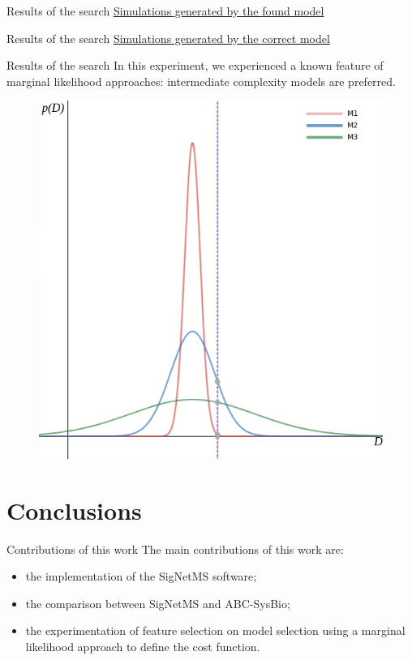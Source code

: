 \documentclass{beamer}
\begin{document}
\begin{frame}{Results of the search}
\href{https://linux.ime.usp.br/~gustavoem/defesa/ras_solution_simulations.gif}
{Simulations generated by the found model}
\end{frame}

\begin{frame}{Results of the search}
\href{https://linux.ime.usp.br/~gustavoem/defesa/ras_correct_model.gif}
{Simulations generated by the correct model}
\end{frame}


\begin{frame}{Results of the search}
In this experiment, we experienced a known feature of marginal
likelihood approaches: \pause \alert{intermediate complexity models are
preferred}.

\begin{figure}
\includegraphics[width=.5\textwidth]{intermediate_complexity_2.png}
\end{figure}
\end{frame}

\section{Conclusions}

\begin{frame}{Contributions of this work}
The main contributions of this work are:
\begin{itemize}
    \pause
    \item{the implementation of the SigNetMS software;}
    \pause
    \item{the comparison between SigNetMS and ABC-SysBio;}
    \pause
    \item{the experimentation of feature selection on model selection
        using a marginal likelihood approach to define the cost
        function.}
\end{itemize}
\end{frame}
\end{document}
